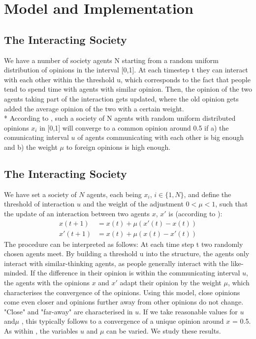 \documentclass[11pt]{article}
\begin{document}
\section{Model and Implementation}

\subsection{The Interacting Society}
We have a number of society agents N starting from a random uniform distribution of opinions in the interval [0,1]. At each timestep t they can interact with each other within the threshold u, which corresponds to the fact that people tend to spend time with agents with similar opinion. Then, the opinion of the two agents taking part of the interaction gets updated, where the old opinion gets added the average opinion of the two with a certain weight. \\*
According to \cite{Minor}, such a society of N agents with random uniform distributed opinions $x_i$ in [0,1] will converge to a common opinion around 0.5 if a) the comunicating interval $u$ of agents communicating with each other is big enough and b) the weight $\mu$ to foreign opinions is high enough.

\subsection{The Interacting Society}
We have set a society of $N$ agents, each being $x_i$, $i \in \{1, N \}$, and define the threshold of interaction $u$ and the weight of the adjustment $0 < \mu < 1$, such that the update of an interaction between two agents $x$, $x'$ is (according to \cite{Minor}):
\begin{equation}
\begin{aligned}
x(t+1) &= x(t) + \mu(x'(t) - x(t))  \\
x'(t+1) &= x(t) + \mu(x(t) - x'(t)) 
\end{aligned}
\end{equation}
The procedure can be interpreted as follows: At each time step t two randomly chosen agents meet. By building a threshold u into the structure, the agents only interact with similar-thinking agents, as people generally interact with the like-minded. If the difference in their opinion is within the communicating interval $u$, the agents with the opinions $x$ and $x'$ adapt their opinion by the weight $\mu$, which characterises the convergence of the opinions. Using this model, close opinions come even closer and opinions further away from other opinions do not change. "Close" and "far-away" are characterised in $u$. If we take reasonable values for $u$ and$\mu$ , this typically follows to a convergence of a unique opinion around $x$ = 0.5.
As within \cite{Minor}, the variables $u$ and $\mu$ can be varied. We study these results.
\end{document}
